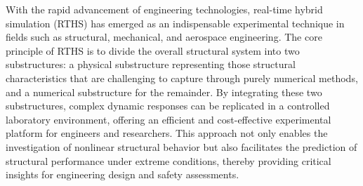 \documentclass[a4paper, 10pt, conference]{ieeeconf}      %
\begin{document}
With the rapid advancement of engineering technologies, real-time hybrid simulation (RTHS) \cite{Nakashima1992, Horiuchi1999} has emerged as an indispensable experimental technique in fields such as structural, mechanical, and aerospace engineering. The core principle of RTHS is to divide the overall structural system into two substructures: a physical substructure representing those structural characteristics that are challenging to capture through purely numerical methods, and a numerical substructure for the remainder. By integrating these two substructures, complex dynamic responses can be replicated in a controlled laboratory environment, offering an efficient and cost-effective experimental platform for engineers and researchers. This approach not only enables the investigation of nonlinear structural behavior but also facilitates the prediction of structural performance under extreme conditions, thereby providing critical insights for engineering design and safety assessments.
\end{document}

